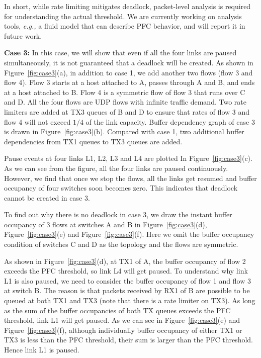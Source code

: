 In short, while rate limiting mitigates deadlock, packet-level analysis is required for understanding
the actual threshold. We are currently working on analysis tools, {\em e.g.,} a fluid model that
can describe PFC behavior, and will report it in future work.







\textbf{Case 3:} In this case, we will show that even if all the four links are paused simultaneously,
it is not guaranteed that a deadlock will be created. As shown in Figure~\ref{fig:case3}(a), in addition
to case 1, we add another two flows (flow 3 and flow 4). Flow 3 starts at a host attached to A, passes
through A and B, and ends at a host attached to B. Flow 4 is a symmetric flow of flow 3 that runs over
C and D. All the four flows are UDP flows with infinite traffic demand. Two rate limiters are added at
TX3 queues of B and D to ensure that rates of flow 3 and flow 4 will not exceed $1/4$ of the link
capacity. Buffer dependency graph of case 3 is drawn in Figure~\ref{fig:case3}(b). Compared with case 1,
two additional buffer dependencies from TX1 queues to TX3 queues are added.

Pause events at four links L1, L2, L3 and L4 are plotted In Figure~\ref{fig:case3}(c).  As we can see
from the figure, all the four links are paused continuously. However, we find that once we stop the
flows, all the links get resumed and buffer occupancy of four switches soon becomes zero. This
indicates that deadlock cannot be created in case 3.

To find out why there is no deadlock in case 3, we draw the instant buffer occupancy of 3 flows at
switches A and B in Figure~\ref{fig:case3}(d), Figure~\ref{fig:case3}(e) and Figure~\ref{fig:case3}(f).
Here we omit the buffer occupancy condition of switches C and D as the topology and the flows are symmetric.

As shown in Figure~\ref{fig:case3}(d), at TX1 of A, the buffer occupancy of flow 2 exceeds the PFC
threshold, so link L4 will get paused. To understand why link L1 is also paused, we need to consider
the buffer occupancy of flow 1 and flow 3 at switch B. The reason is that packets received by RX1 of
B are possible to be queued at both TX1 and TX3 (note that there is a rate limiter on TX3). As long
as the sum of the buffer occupancies of both TX queues exceeds the PFC threshold, link L1 will get paused.
As we can see in Figure~\ref{fig:case3}(e) and Figure~\ref{fig:case3}(f), although individually buffer
occupancy of either TX1 or TX3 is less than the PFC threshold, their sum is larger than the PFC
threshold. Hence link L1 is paused.

